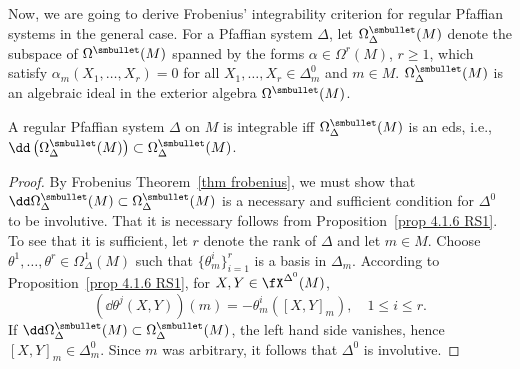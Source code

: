 Now, we are going to derive Frobenius' integrability criterion for regular Pfaffian systems in the general case. For a Pfaffian system $\Delta$, let $\Omega^{\smbullet }_\Delta(M)$ denote the subspace of $\Omega^{\smbullet }(M)$ spanned by the forms $\alpha\in\Omega^r(M)$, $r\geq 1$, which satisfy $\alpha_m(X_1,\ldots,X_r)=0$ for all $X_1,\ldots,X_r\in \Delta^0_m$ and $m\in M$. $\Omega^{\smbullet }_\Delta(M)$ is an algebraic ideal in the exterior algebra $\Omega^{\smbullet }(M)$.

\begin{thm}\label{thm 4.7.8 RS1}
    A regular Pfaffian system $\Delta$ on $M$ is integrable iff $\Omega^{\smbullet }_\Delta(M)$ is an \gls{eds}, i.e., $\dd \left(\Omega^{\smbullet }_\Delta(M)\right)\subset \Omega^{\smbullet }_\Delta(M)$.
\end{thm}
\begin{proof}
    By Frobenius Theorem~\ref{thm frobenius}, we must show that $\dd\Omega^{\smbullet }_\Delta(M)\subset \Omega^{\smbullet }_\Delta(M)$ is a necessary and sufficient condition for $\Delta^0$ to be involutive. That it is necessary follows from Proposition~\ref{prop 4.1.6 RS1}. To see that it is sufficient, let $r$ denote the rank of $\Delta$ and let $m\in M$. Choose $\theta^1,\ldots,\theta^r\in \Omega^1_\Delta(M)$ such that $\{\theta^i_m\}_{i=1}^r$ is a basis in $\Delta_m$. According to Proposition~\ref{prop 4.1.6 RS1}, for $X,Y\in\fX^{\Delta^0}(M)$, 
    \[\left(\dd \theta^j(X,Y)\right)(m)=-\theta^i_m([X,Y]_m),\quad 1\leq i\leq r.\]
    If $\dd\Omega^{\smbullet }_\Delta(M)\subset\Omega^{\smbullet }_\Delta(M)$, the left hand side vanishes, hence $[X,Y]_m\in\Delta_m^0$. Since $m$ was arbitrary, it follows that $\Delta^0$ is involutive.
\end{proof}


